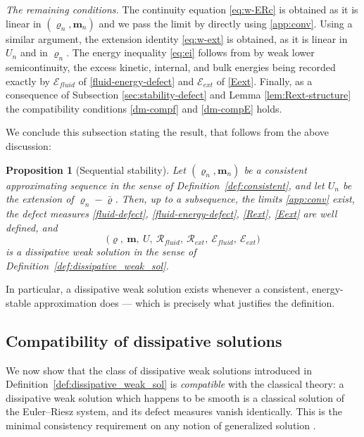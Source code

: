 \documentclass[12pt,a4paper,twoside]{article}
\newcommand{\vr}{\varrho}
\newcommand{\vu}{\vc{u}}
\newcommand{\vc}[1]{{\bf #1}}
\newtheorem{prop}[thm]{Proposition}
\numberwithin{equation}{section}%
\begin{document}
\medskip
\noindent\emph{The remaining conditions.} The continuity equation \eqref{eq:w-ERc} is obtained as it is linear in $(\vr_n,\mathbf m_n)$ and we pass the limit by directly using \eqref{app:conv}. Using a similar argument, the extension identity \eqref{eq:w-ext} is obtained, as it is linear in $U_n$ and in $\vr_n$. The energy inequality \eqref{eq:ei} follows from by weak lower semicontinuity, the excess kinetic, internal, and bulk energies being recorded exactly by $\mathcal E_{fluid}$ of \eqref{fluid-energy-defect} and $\mathcal E_{ext}$ of \eqref{Eext}. Finally, as a consequence of Subsection \ref{sec:stability-defect} and Lemma \ref{lem:Rext-structure} the compatibility conditions \eqref{dm-compf} and \eqref{dm-compE} holds.  

We conclude this subsection stating the result, that follows from the above discussion: 
\begin{prop}[Sequential stability]\label{prop:sequential-stability}
	Let $(\vr_n,\mathbf m_n)$ be a consistent approximating sequence in the sense of Definition~\ref{def:consistent}, and let $U_n$ be the extension of $\vr_n - \bar\vr$. Then, up to a subsequence, the limits \eqref{app:conv} exist, the defect measures \eqref{fluid-defect}, \eqref{fluid-energy-defect}, \eqref{Rext}, \eqref{Eext} are well defined, and
	\[
	\big(\vr,\ \mathbf m,\ U,\ \mathcal R_{fluid},\ \mathcal R_{ext},\ \mathcal E_{fluid},\ \mathcal E_{ext}\big)
	\]
	is a dissipative weak solution in the sense of Definition~\ref{def:dissipative_weak_sol}.
\end{prop}

In particular, a dissipative weak solution exists whenever a consistent, energy-stable approximation does --- which is precisely what justifies the definition.



\subsection{Compatibility of dissipative solutions}
\label{sec:compatibility}

We now show that the class of dissipative weak solutions introduced in Definition~\ref{def:dissipative_weak_sol} is \emph{compatible} with the classical theory: a dissipative weak solution which happens to be smooth is a classical solution of the Euler--Riesz system, and its defect measures vanish identically. This is the minimal consistency requirement on any notion of generalized solution .%
\end{document}

